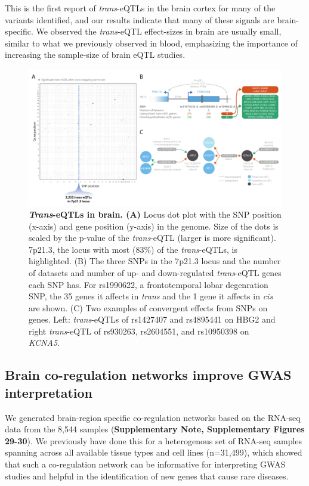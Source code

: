 This is the first report of \textit{trans}-eQTLs in the brain cortex for many of the variants identified, and our results indicate that many of these signals are brain-specific. We observed the \textit{trans}-eQTL effect-sizes in brain are usually small, similar to what we previously observed in blood, emphasizing the importance of increasing the sample-size of brain eQTL studies. 

\begin{figure}[H]
	\includegraphics[width=\textwidth]{chapters/chapter5-brain-eqtls/img/2021-02-11-fig6-trans-eQTLs-v2.pdf}
	\caption{\textbf{\textit{Trans}-eQTLs in brain. (A)} Locus dot plot with the SNP position (x-axis) and gene position (y-axis) in the genome. Size of the dots is scaled by the p-value of the \textit{trans}-eQTL (larger is more significant). 7p21.3, the locus with most (83\%) of the \textit{trans}-eQTLs, is highlighted. (B) The three SNPs in the 7p21.3 locus and the number of datasets and number of up- and down-regulated \textit{trans}-eQTL genes each SNP has. For rs1990622, a frontotemporal lobar degenration SNP, the 35 genes it affects in \textit{trans}  and the 1 gene it affects in \textit{cis} are shown.  (C) Two examples of convergent effects from SNPs on genes. Left: \textit{trans}-eQTLs of rs1427407 and rs4895441 on HBG2 and right \textit{trans}-eQTL of rs930263, rs2604551, and rs10950398 on \textit{KCNA5}.}
	\label{metabrain_fig6}
\end{figure}

\subsection{Brain co-regulation networks improve GWAS interpretation}
We generated brain-region specific co-regulation networks based on the RNA-seq data from the 8,544 samples (\textbf{Supplementary Note, Supplementary Figures 29-30}). We previously have done this for a heterogenous set of RNA-seq samples spanning across all available tissue types and cell lines (n=31,499)\cite{persBiologicalInterpretationGenomewide2015,deelenImprovingDiagnosticYield2019}, which showed that such a co-regulation network can be informative for interpreting GWAS studies\cite{persBiologicalInterpretationGenomewide2015} and helpful in the identification of new genes that cause rare diseases\cite{deelenImprovingDiagnosticYield2019}. 
	
